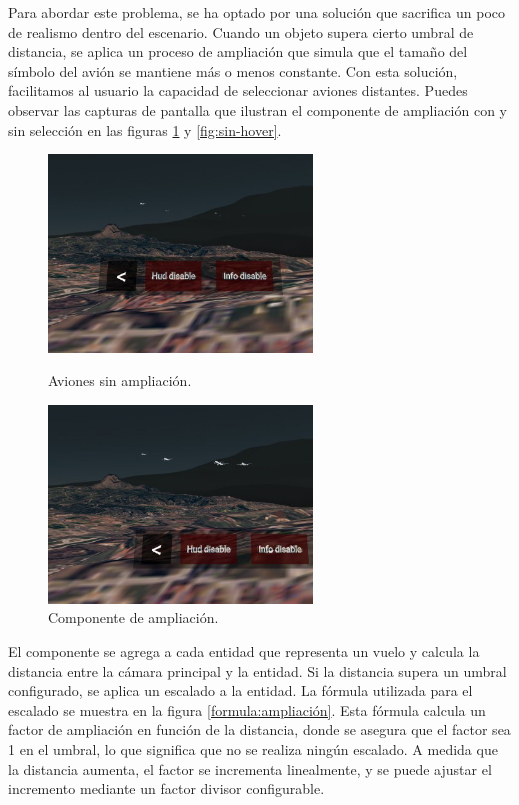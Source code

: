 \documentclass[a4paper, 11pt]{book}
\begin{document}
Para abordar este problema, se ha optado por una solución que sacrifica un poco de realismo dentro del escenario. Cuando un objeto supera cierto umbral de distancia, se aplica un proceso de ampliación que simula que el tamaño del símbolo del avión se mantiene más o menos constante. Con esta solución, facilitamos al usuario la capacidad de seleccionar aviones distantes. Puedes observar las capturas de pantalla que ilustran el componente de ampliación con y sin selección en las figuras \ref{fig:con-hover} y \ref{fig:sin-hover}.
\begin{figure}[h]
  \begin{minipage}[t]{0.5\linewidth}
    \centering
    \includegraphics[width=7cm, keepaspectratio]{img/sin_hover.jpg}
    \caption{Aviones sin ampliación.}
    \label{fig:sin-hover}
  \end{minipage}%
  \begin{minipage}[t]{0.5\linewidth}
    \centering
    \includegraphics[width=7cm, keepaspectratio]{img/con_hover.jpg}
    \caption{Componente de ampliación.}
    \label{fig:con-hover}    
  \end{minipage}
\end{figure}
El componente se agrega a cada entidad que representa un vuelo y calcula la distancia entre la cámara principal y la entidad. Si la distancia supera un umbral configurado, se aplica un escalado a la entidad. La fórmula utilizada para el escalado se muestra en la figura \ref{formula:ampliación}. Esta fórmula calcula un factor de ampliación en función de la distancia, donde se asegura que el factor sea 1 en el umbral, lo que significa que no se realiza ningún escalado. A medida que la distancia aumenta, el factor se incrementa linealmente, y se puede ajustar el incremento mediante un factor divisor configurable. 
\end{document}
